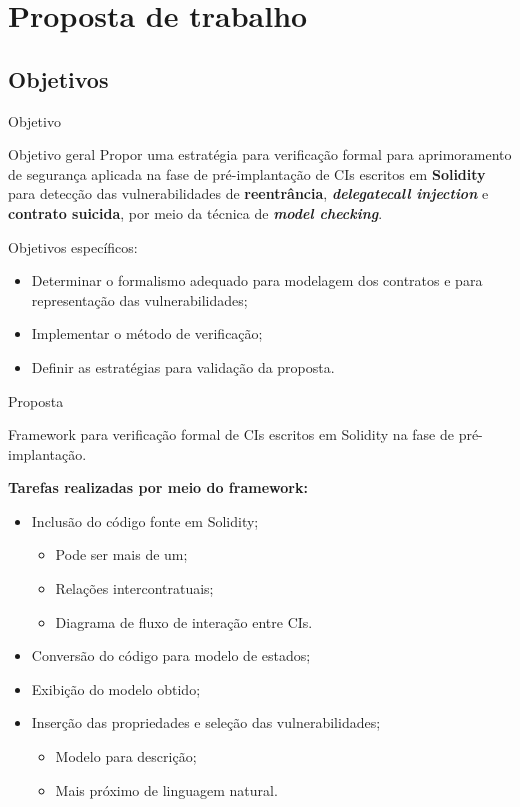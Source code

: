 \section{Proposta de trabalho}
\subsection{Objetivos}
\begin{frame}{Objetivo}
    \begin{block}{Objetivo geral}
    Propor uma estratégia para verificação formal para aprimoramento de segurança aplicada na fase de pré-implantação de CIs escritos em \textbf{Solidity} para detecção das vulnerabilidades de \textbf{reentrância}, \textbf{\textit{delegatecall injection}} e \textbf{contrato suicida}, por meio da técnica de \textbf{\textit{model checking}}.
    \end{block}
    Objetivos específicos:
    \begin{itemize}
        \item Determinar o formalismo adequado para modelagem dos contratos e para representação das vulnerabilidades;
        \item Implementar o método de verificação;
        \item Definir as estratégias para validação da proposta.
    \end{itemize}
\end{frame}

\begin{frame}{Proposta}
    \begin{block}{}
    Framework para verificação formal de CIs escritos em Solidity na fase de pré-implantação.
    \end{block}
    \textbf{Tarefas realizadas por meio do framework:}
    \begin{itemize}
        \item Inclusão do código fonte em Solidity;
        \begin{itemize}
            \item Pode ser mais de um;
            \item Relações intercontratuais;
            \item Diagrama de fluxo de interação entre CIs.
        \end{itemize}
        \item Conversão do código para modelo de estados;
        \item Exibição do modelo obtido;
        \item Inserção das propriedades e seleção das vulnerabilidades;
        \begin{itemize}
            \item Modelo para descrição;
            \item Mais próximo de linguagem natural.
        \end{itemize}
    \end{itemize}
\end{frame}

